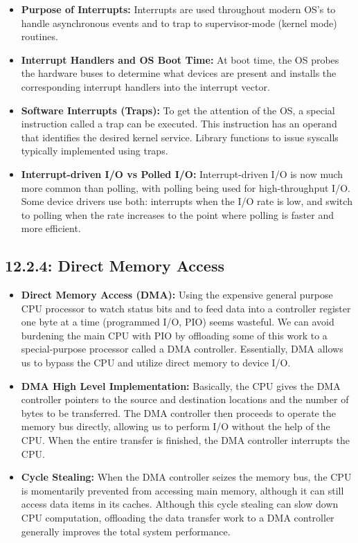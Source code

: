 \documentclass[12pt]{article}
\begin{document}
\begin{itemize}
    \item \textbf{Purpose of Interrupts:} Interrupts are used throughout modern OS's to handle asynchronous events and to trap to supervisor-mode (kernel mode) routines.
    \item \textbf{Interrupt Handlers and OS Boot Time:} At boot time, the OS probes the hardware buses to determine what devices are present and installs the corresponding interrupt handlers into the interrupt vector.
    \item \textbf{Software Interrupts (Traps):} To get the attention of the OS, a special instruction called a trap can be executed. This instruction has an operand that identifies the desired kernel service. Library functions to issue syscalls typically implemented using traps.
    \item \textbf{Interrupt-driven I/O vs Polled I/O:} Interrupt-driven I/O is now much more common than polling, with polling being used for high-throughput I/O. Some device drivers use both: interrupts when the I/O rate is low, and switch to polling when the rate increases to the point where polling is faster and more efficient.
\end{itemize}

\subsection*{12.2.4: Direct Memory Access}

\begin{itemize}
    \item \textbf{Direct Memory Access (DMA):} Using the expensive general purpose CPU processor to watch status bits and to feed data into a controller register one byte at a time (programmed I/O, PIO) seems wasteful. We can avoid burdening the main CPU with PIO by offloading some of this work to a special-purpose processor called a DMA controller. Essentially, DMA allows us to bypass the CPU and utilize direct memory to device I/O.
    \item \textbf{DMA High Level Implementation:} Basically, the CPU gives the DMA controller pointers to the source and destination locations and the number of bytes to be transferred. The DMA controller then proceeds to operate the memory bus directly, allowing us to perform I/O without the help of the CPU. When the entire transfer is finished, the DMA controller interrupts the CPU.
    \item \textbf{Cycle Stealing:} When the DMA controller seizes the memory bus, the CPU is momentarily prevented from accessing main memory, although it can still access data items in its caches. Although this cycle stealing can slow down CPU computation, offloading the data transfer work to a DMA controller generally improves the total system performance.
\end{itemize}
\end{document}
